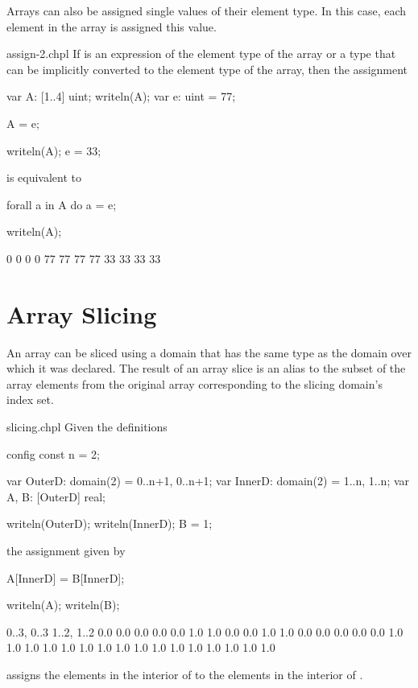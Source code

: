 
Arrays can also be assigned single values of their element type.  In
this case, each element in the array is assigned this value.
\begin{chapelexample}{assign-2.chpl}
If  is an expression of the element type of the array or a
type that can be implicitly converted to the element type of the
array, then the assignment
\begin{chapelpre}
var A: [1..4] uint;
writeln(A);
var e: uint = 77;
\end{chapelpre}
\begin{chapel}
A = e;
\end{chapel}
\begin{chapelnoprint}
writeln(A);
e = 33;
\end{chapelnoprint}
is equivalent to
\begin{chapel}
forall a in A do
  a = e;
\end{chapel}
\begin{chapelpost}
writeln(A);
\end{chapelpost}
\begin{chapeloutput}
0 0 0 0
77 77 77 77
33 33 33 33
\end{chapeloutput}
\end{chapelexample}

\section{Array Slicing}
\label{Array_Slicing}

An array can be sliced using a domain that has the same type as the
domain over which it was declared.  The result of an array slice is an
alias to the subset of the array elements from the original array
corresponding to the slicing domain's index set.
 
\begin{chapelexample}{slicing.chpl}
Given the definitions
\begin{chapelpre}
config const n = 2;
\end{chapelpre}
\begin{chapel}
var OuterD: domain(2) = {0..n+1, 0..n+1};
var InnerD: domain(2) = {1..n, 1..n};
var A, B: [OuterD] real;
\end{chapel}
\begin{chapelnoprint}
writeln(OuterD);
writeln(InnerD);
B = 1;
\end{chapelnoprint}
the assignment given by
\begin{chapel}
A[InnerD] = B[InnerD];
\end{chapel}
\begin{chapelpost}
writeln(A);
writeln(B);
\end{chapelpost}
\begin{chapeloutput}
{0..3, 0..3}
{1..2, 1..2}
0.0 0.0 0.0 0.0
0.0 1.0 1.0 0.0
0.0 1.0 1.0 0.0
0.0 0.0 0.0 0.0
1.0 1.0 1.0 1.0
1.0 1.0 1.0 1.0
1.0 1.0 1.0 1.0
1.0 1.0 1.0 1.0
\end{chapeloutput}
assigns the elements in the interior of  to the elements in
the interior of .
\end{chapelexample}

